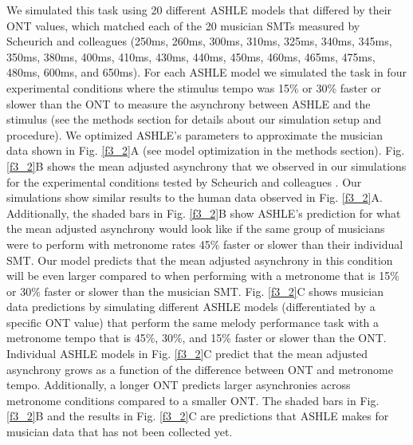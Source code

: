 \documentclass{report}
\begin{document}
We simulated this task using 20 different ASHLE models that differed by their ONT values, which matched each of the 20 musician SMTs measured by Scheurich and colleagues \cite{scheurich2018tapping} (250ms, 260ms, 300ms, 310ms, 325ms, 340ms, 345ms, 350ms, 380ms, 400ms, 410ms, 430ms, 440ms, 450ms, 460ms, 465ms, 475ms, 480ms, 600ms, and 650ms). For each ASHLE model we simulated the task in four experimental conditions where the stimulus tempo was 15\% or 30\% faster or slower than the ONT to measure the asynchrony between ASHLE and the stimulus (see the methods section for details about our simulation setup and procedure). We optimized ASHLE's parameters to approximate the musician data shown in Fig.{} \ref{f3_2}A (see model optimization in the methods section). Fig.{} \ref{f3_2}B shows the mean adjusted asynchrony that we observed in our simulations for the experimental conditions tested by Scheurich and colleagues \cite{scheurich2018tapping}. Our simulations show similar results to the human data observed in Fig.{} \ref{f3_2}A. Additionally, the shaded bars in Fig.{} \ref{f3_2}B show ASHLE's prediction for what the mean adjusted asynchrony would look like if the same group of musicians were to perform with metronome rates 45\% faster or slower than their individual SMT. Our model predicts that the mean adjusted asynchrony in this condition will be even larger compared to when performing with a metronome that is 15\% or 30\% faster or slower than the musician SMT. Fig.{} \ref{f3_2}C shows musician data predictions by simulating different ASHLE models (differentiated by a specific ONT value) that perform the same melody performance task with a metronome tempo that is 45\%, 30\%, and 15\% faster or slower than the ONT. Individual ASHLE models in Fig.{} \ref{f3_2}C predict that the mean adjusted asynchrony grows as a function of the difference between ONT and metronome tempo. Additionally, a longer ONT predicts larger asynchronies across metronome conditions compared to a smaller ONT. The shaded bars in Fig.{} \ref{f3_2}B and the results in Fig.{} \ref{f3_2}C are predictions that ASHLE makes for musician data that has not been collected yet.
\end{document}
